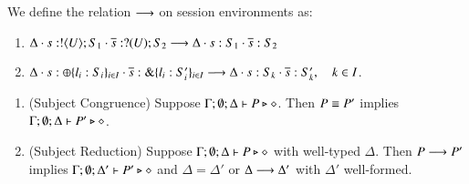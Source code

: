 \begin{definition}%
\label{def:ses_red}
	We define the relation $\longrightarrow$ on session environments as:
	\begin{enumerate}[$-$]
		\item	$\Delta \cdot s: ! \langle U \rangle ; S_1 \cdot \overline{s}: ? (U) ; S_2 \longrightarrow \Delta \cdot s: S_1 \cdot \overline{s}: S_2$
		\item	$\Delta \cdot s: \oplus \{l_i: S_i\}_{i \in I} \cdot \overline{s}: \& \{l_i: S_i'\}_{i \in I} \longrightarrow \Delta \cdot s: S_k \cdot \overline{s}: S_k', \quad k \in I$.
	\end{enumerate}
\end{definition}

\begin{theorem}\label{t:sr}%
	\begin{enumerate}[1.]
		\item	(Subject Congruence) Suppose $\Gamma; \emptyset; \Delta \vdash P \triangleright \diamond$.
			Then $P \equiv P'$ implies $\Gamma; \emptyset; \Delta \vdash P' \triangleright \diamond$.

		\item	(Subject Reduction) Suppose $\Gamma; \emptyset; \Delta \vdash P \triangleright \diamond$
			with
			well-typed $\Delta$. 
			Then $P \longrightarrow P'$ implies $\Gamma; \emptyset; \Delta'  \vdash P' \triangleright \diamond$
			and $\Delta = \Delta'$ or $\Delta \longrightarrow \Delta'$
with $\Delta'$ well-formed. 
	\end{enumerate}
\end{theorem}
